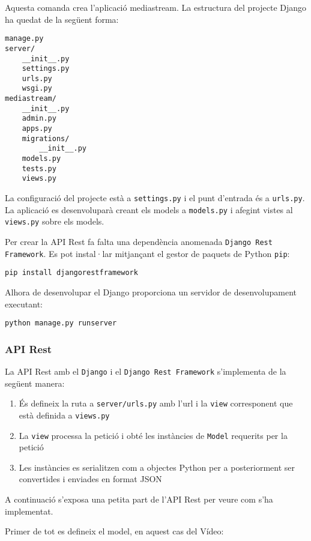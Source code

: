 \documentclass[12pt, titlepage]{article}
\begin{document}
Aquesta comanda crea l'aplicació mediastream. La estructura del projecte Django
ha quedat de la següent forma:

\begin{lstlisting}
manage.py
server/
    __init__.py
    settings.py
    urls.py
    wsgi.py
mediastream/
    __init__.py
    admin.py
    apps.py
    migrations/
        __init__.py
    models.py
    tests.py
    views.py
\end{lstlisting}

La configuració del projecte està a \verb|settings.py| i el punt d'entrada és a
\verb|urls.py|. La aplicació es desenvoluparà creant els models a \verb|models.py|
i afegint vistes al \verb|views.py| sobre els models.

Per crear la API Rest fa falta una dependència anomenada \verb|Django Rest Framework|.
Es pot instal·lar mitjançant el gestor de
paquets de Python \verb|pip|:

\begin{lstlisting}
pip install djangorestframework
\end{lstlisting}

Alhora de desenvolupar el Django proporciona un servidor de desenvolupament executant:

\begin{lstlisting}
python manage.py runserver
\end{lstlisting}

\subsubsection{API Rest}

La API Rest amb el \verb|Django| i el \verb|Django Rest Framework| s'implementa
de la següent manera:

\begin{enumerate}
\item És defineix la ruta a \verb|server/urls.py| amb l'url i la \verb|view|
corresponent que està definida a \verb|views.py|
\item La \verb|view| processa la petició i obté les instàncies de \verb|Model|
requerits per la petició
\item Les instàncies es serialitzen com a objectes Python per a posteriorment ser
convertides i enviades en format JSON
\end{enumerate}

A continuació s'exposa una petita part de l'API Rest per veure com s'ha implementat.

Primer de tot es defineix el model, en aquest cas del Vídeo:
\end{document}
